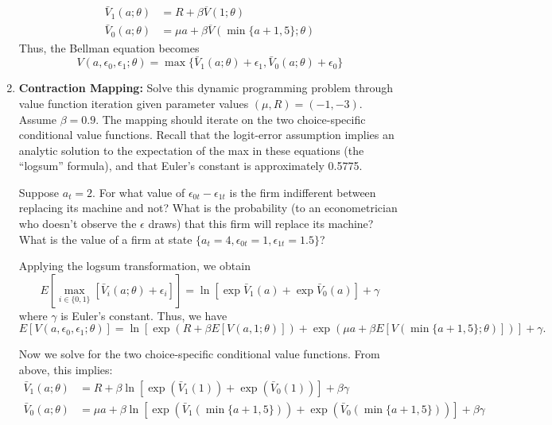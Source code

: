 \documentclass{article}
\begin{document}
\begin{enumerate}
\begin{answer}
\begin{align}
    \bar{V}_1(a; \theta) &= R + \beta \overline{V}(1; \theta)\\ 
    \bar{V}_0(a; \theta) &= \mu a + \beta \overline{V}(\min\{a + 1, 5\}; \theta)
\end{align}
Thus, the Bellman equation becomes
\begin{equation}
    V(a, \epsilon_0, \epsilon_1; \theta) = \max\{ \bar{V}_1(a; \theta) + \epsilon_1, \bar{V}_0(a; \theta) + \epsilon_0\}
\end{equation}

\end{answer}



\item \textbf{Contraction Mapping:} Solve this dynamic programming problem through
value function iteration given parameter values $(\mu, R) = (-1, -3)$. Assume $\beta = 0.9$. The mapping should iterate on the two choice-specific
conditional value functions. Recall that the logit-error assumption implies an analytic solution to the expectation of the max in these equations (the ``logsum'' formula), and that Euler’s constant is approximately 0.5775. 

Suppose $a_t = 2$. For what value of $\epsilon_{0t} -\epsilon_{1t}  $ is the firm indifferent between replacing its machine and not? What is the probability (to an econometrician who doesn’t observe the $\epsilon$ draws) that this firm will replace its machine? What is the value of a firm at state
$\{a_t = 4, \epsilon_{0t} = 1, \epsilon_{1t} = 1.5\}$?

\begin{answer}

Applying the logsum transformation, we obtain 
\[
 E\left[ \max_{i \in \{0, 1\}}[ \bar{V}_i(a; \theta) + \epsilon_i] \right] = \ln\left[ \exp \bar{V}_1(a) + \exp \bar{V}_0(a) \right] + \gamma 
\]
where $\gamma$ is Euler's constant. Thus, we have 
\begin{equation}
    E[V(a, \epsilon_0, \epsilon_1; \theta)] = \ln \left[ 
    \exp( R + \beta E[V(a, 1; \theta)]) + 
    \exp(\mu a + \beta E[V(\min\{a + 1, 5\}; \theta)])
    \right] + \gamma. 
\end{equation}

Now we solve for the two choice-specific conditional value functions. From above, this implies: 
\begin{align*}
    \bar{V}_1(a; \theta) &= R + \beta \ln \left[
        \exp(\bar{V}_1(1)) + \exp(\bar{V}_0(1))
    \right] + \beta \gamma \\ 
    \bar{V}_0(a; \theta) &= \mu a + \beta \ln \left[
        \exp(\bar{V}_1(\min\{a + 1, 5\})) + \exp(\bar{V}_0(\min\{a + 1, 5\}))
    \right] + \beta \gamma
\end{align*}



\end{answer}
\end{enumerate}
\end{document}
